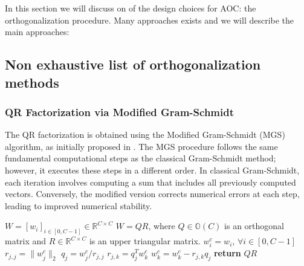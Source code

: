     In this section we will discuss on of the design choices for AOC: the orthogonalization procedure. Many approaches exists and we will describe the main approaches:

    \subsection{Non exhaustive list of orthogonalization methods}

    \subsubsection{QR Factorization via Modified Gram-Schmidt}

        The QR factorization is obtained using the Modified Gram-Schmidt (MGS) algorithm, as initially proposed in \cite{LaPlace1820}. The MGS procedure follows the same fundamental computational steps as the classical Gram-Schmidt method; however, it executes these steps in a different order. In classical Gram-Schmidt, each iteration involves computing a sum that includes all previously computed vectors. Conversely, the modified version corrects numerical errors at each step, leading to improved numerical stability.
        
        \begin{algorithm}   
        \begin{algorithmic}[1]
        \Require $W = [w_i]_{i\in[0,C-1]}  \in \mathbb{R}^{C\times C}$ 
        \Ensure $W= QR$, where $Q\in\mathbb{O}(C)$ is an orthogonal matrix and $R\in \mathbb{R}^{C\times C}$ is an upper triangular matrix.
        \State $w^c_i = w_i$, $\forall i\in[0,C-1]$ 
            \State $r_{j,j} = \|w^c_j\|_2$
            \State $q_j = w^c_j/r_{j,j}$
                \State $r_{j,k} = q_j^T w^c_k$
                \State $w^c_k = w^c_k - r_{j,k} q_j$
            \EndFor
        \EndFor
        \State \textbf{return} $QR$
        \EndProcedure
        \end{algorithmic}
        \caption{QR Factorization via Modified Gram-Schmidt}   \label{alg:MGS} 
        \end{algorithm}
        
        
